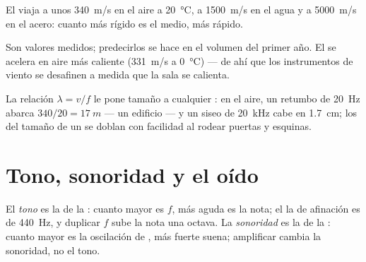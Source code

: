 \begin{proposition}\label{prop:g12:sound-acoustics:speed}
%
El  viaja a unos \qty{340}{m/s} en el aire a
\qty{20}{\degreeCelsius}, a \qty{1500}{m/s} en el agua y a
\qty{5000}{m/s} en el acero: cuanto más rígido es el medio, más rápido.
\admitted
\end{proposition}

\begin{remark}\label{rem:g12:sound-acoustics:temperature}
Son valores medidos; predecirlos se hace en el volumen del primer año.
El  se acelera en aire más caliente (\qty{331}{m/s} a
\qty{0}{\degreeCelsius}) --- de ahí que los instrumentos de viento se
desafinen a medida que la sala se calienta.
\end{remark}

\begin{example}\label{ex:g12:sound-acoustics:wavelengths}
La relación $\lambda = v/f$ le pone tamaño a cualquier : en el
aire, un retumbo de \qty{20}{Hz} abarca $340/20 = \qty{17}{m}$ --- un
edificio --- y un siseo de \qty{20}{kHz} cabe en \qty{1.7}{cm}; los del
tamaño de un  se doblan con facilidad al rodear puertas y
esquinas.
\end{example}

\section{Tono, sonoridad y el oído}

\begin{definition}\label{def:g12:sound-acoustics:pitch-loudness}
El \emph{tono} es la  de la : cuanto
mayor es $f$, más aguda es la nota; el la de afinación es de
\qty{440}{Hz}, y duplicar $f$ sube la nota una octava. La
\emph{sonoridad} es la  de la :
cuanto mayor es la oscilación de , más fuerte suena; amplificar
cambia la sonoridad, no el tono.
\end{definition}

